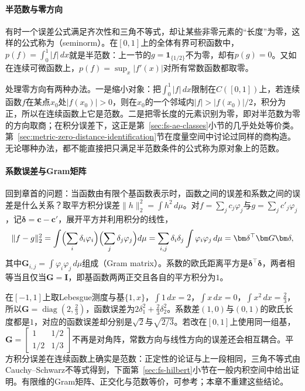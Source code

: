 \paragraph{半范数与零方向}
有时一个误差公式满足齐次性和三角不等式，却让某些非零元素的“长度”为零，这样的公式称为（seminorm）。在$[0,1]$上的全体有界可积函数中，$p(f)=\int_0^1|f|\,dx$就是半范数：上一节的$g=\mathbf 1_{\{1/2\}}$不为零，却有$p(g)=0$。又如在连续可微函数上，$p(f)=\sup_x|f'(x)|$对所有常数函数都取零。

处理零方向有两种办法。一是缩小对象：把$\int_0^1|f|\,dx$限制在$C([0,1])$上，若连续函数$f$在某点$x_0$处$|f(x_0)|>0$，则在$x_0$的一个邻域内$|f|>|f(x_0)|/2$，积分为正，所以在连续函数上它是范数。二是把零长度的元素识别为零，即对半范数为零的方向取商；在积分误差下，这正是第~\ref{sec:fs-ae-classes}小节的几乎处处等价类。第~\ref{sec:metric-zero-distance-identification}节在度量空间中讨论过同样的商构造。无论哪种办法，都不能直接把只满足半范数条件的公式称为原对象上的范数。

\paragraph{系数误差与Gram矩阵}
回到章首的问题：当函数由有限个基函数表示时，函数之间的误差和系数之间的误差是什么关系？取平方积分误差$\|h\|_2^2=\int h^2\,d\mu$。对$f=\sum_jc_j\varphi_j$与$g=\sum_jc'_j\varphi_j$，记$\bm\delta=\bm c-\bm c'$，展开平方并利用积分的线性，
\[
 \|f-g\|_2^2=\int\Bigl(\sum_{i}\delta_i\varphi_i\Bigr)\Bigl(\sum_j\delta_j\varphi_j\Bigr)d\mu
 =\sum_{i,j}\delta_i\delta_j\int\varphi_i\varphi_j\,d\mu
 =\bm\delta^{\top}\bm G\bm\delta,
\]
其中$\bm G_{i,j}=\int\varphi_i\varphi_j\,d\mu$组成（Gram matrix）。系数的欧氏距离平方是$\bm\delta^{\top}\bm\delta$，两者相等当且仅当$\bm G=\bm I$，即基函数两两正交且各自的平方积分为$1$。

在$[-1,1]$上取Lebesgue测度与基$\{1,x\}$，$\int1\,dx=2$，$\int x\,dx=0$，$\int x^2\,dx=\tfrac23$，所以$\bm G=\operatorname{diag}(2,\tfrac23)$，函数误差为$2\delta_1^2+\tfrac23\delta_2^2$。系数差$(1,0)$与$(0,1)$的欧氏长度都是$1$，对应的函数误差却分别是$\sqrt2$与$\sqrt{2/3}$。若改在$[0,1]$上使用同一组基，$\bm G=\begin{bmatrix}1&1/2\\1/2&1/3\end{bmatrix}$不再是对角阵，常数方向与线性方向的误差还会相互耦合。平方积分误差在连续函数上确实是范数：正定性的论证与上一段相同，三角不等式由Cauchy--Schwarz不等式得到，下面第~\ref{sec:fs-hilbert}小节在一般内积空间中给出证明。有限维的Gram矩阵、正交化与范数等价，可参考；本章不重建这些结论。

